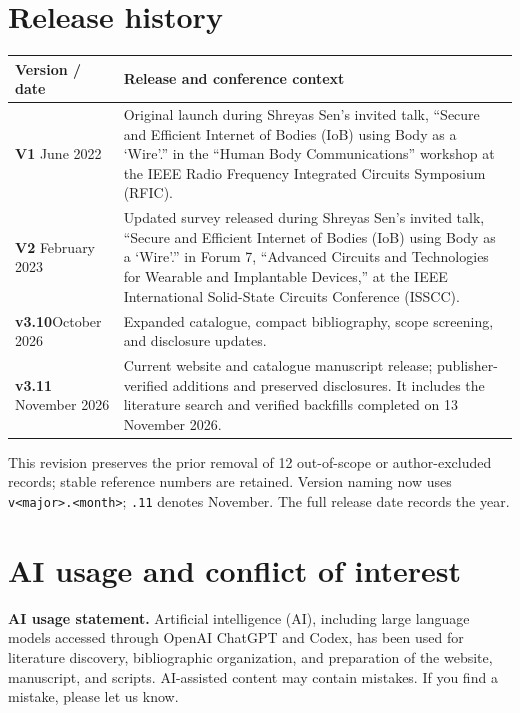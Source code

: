 \documentclass[10pt,letterpaper]{article}
\begin{document}
\section{Release history}
\begin{table}[H]
\centering\small
\begin{tabularx}{\linewidth}{@{}p{.18\linewidth}Y@{}}
\toprule
Version / date & Release and conference context\\
\midrule
\textbf{V1} June 2022 & Original launch during Shreyas Sen's invited talk, ``Secure and Efficient Internet of Bodies (IoB) using Body as a `Wire'.'' in the ``Human Body Communications'' workshop at the IEEE Radio Frequency Integrated Circuits Symposium (RFIC).\\[4pt]
\textbf{V2} February 2023 & Updated survey released during Shreyas Sen's invited talk, ``Secure and Efficient Internet of Bodies (IoB) using Body as a `Wire'.'' in Forum 7, ``Advanced Circuits and Technologies for Wearable and Implantable Devices,'' at the IEEE International Solid-State Circuits Conference (ISSCC).\\[4pt]
\textbf{v3.10}\newline October 2026 & Expanded catalogue, compact bibliography, scope screening, and disclosure updates.\\[4pt]
\textbf{v3.11} November 2026 & Current website and catalogue manuscript release; publisher-verified additions and preserved disclosures. It includes the literature search and verified backfills completed on 13 November 2026.\\
\bottomrule
\end{tabularx}
\end{table}
This revision preserves the prior removal of 12 out-of-scope or author-excluded records; stable reference numbers are retained. Version naming now uses \texttt{v<major>.<month>}; \texttt{.11} denotes November. The full release date records the year.

\section*{AI usage and conflict of interest}
\textbf{AI usage statement.} Artificial intelligence (AI), including large language models accessed through OpenAI ChatGPT and Codex, has been used for literature discovery, bibliographic organization, and preparation of the website, manuscript, and scripts. AI-assisted content may contain mistakes. If you find a mistake, please let us know.
\end{document}
